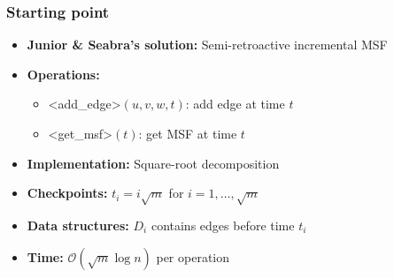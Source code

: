 \documentclass[fleqn]{beamer}
\newcommand{\Oh}{\mathcal{O}}
\def\texttt#1{<#1>}%
\begin{document}
\begin{frame}
    \frametitle{Starting point}
    
    \begin{itemize}
    \item \textbf{Junior \& Seabra's solution:} Semi-retroactive incremental MSF \vfill
    \item \textbf{Operations:}
        \begin{itemize}
        \item \texttt{add\_edge}$(u,v,w,t)$: add edge at time $t$
        \item \texttt{get\_msf}$(t)$: get MSF at time $t$
        \end{itemize} \vfill\pause
    \item \textbf{Implementation:} Square-root decomposition \vfill
    \item \textbf{Checkpoints:} $t_i = i\sqrt{m}$ for $i = 1,\ldots,\sqrt{m}$ \vfill\pause
    \item \textbf{Data structures:} $D_i$ contains edges before time $t_i$ \vfill
    \item \textbf{Time:} $\Oh(\sqrt{m}\log n)$ per operation \vfill
    \end{itemize}
\end{frame}
\end{document}
